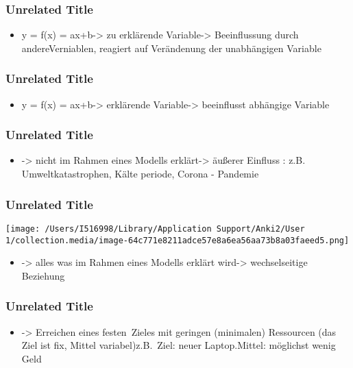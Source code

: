 \documentclass[aspectratio=3218]{beamer}
\begin{document}
\begin{frame}
\frametitle<presentation>{Unrelated Title}


\begin{itemize}
\item y = f(x) = ax+b-> zu erklärende Variable-> Beeinflussung durch andereVerniablen, reagiert auf Verändenung der unabhängigen Variable
\end{itemize}

\note[item]{}
\end{frame}
\begin{frame}
\frametitle<presentation>{Unrelated Title}


\begin{itemize}
\item y = f(x) = ax+b-> erklärende Variable-> beeinflusst abhängige Variable
\end{itemize}

\note[item]{}
\end{frame}
\begin{frame}
\frametitle<presentation>{Unrelated Title}


\begin{itemize}
\item -> nicht im Rahmen eines Modells erklärt-> äußerer Einfluss : z.B. Umweltkatastrophen, Kälte periode, Corona - Pandemie
\end{itemize}

\note[item]{}
\end{frame}
\begin{frame}
\frametitle<presentation>{Unrelated Title}

\begin{center}
\texttt{[image: /Users/I516998/Library/Application Support/Anki2/User 1/collection.media/image-64c771e8211adce57e8a6ea56aa73b8a03faeed5.png]}
\end{center}

\begin{itemize}
\item -> alles was im Rahmen eines Modells erklärt wird-> wechselseitige Beziehung
\end{itemize}

\note[item]{}
\end{frame}
\begin{frame}
\frametitle<presentation>{Unrelated Title}


\begin{itemize}
\item -> Erreichen eines festen Zieles mit geringen (minimalen) Ressourcen (das Ziel ist fix, Mittel variabel)z.B. Ziel: neuer Laptop.Mittel: möglichst wenig Geld
\end{itemize}

\note[item]{}
\end{frame}
\end{document}
